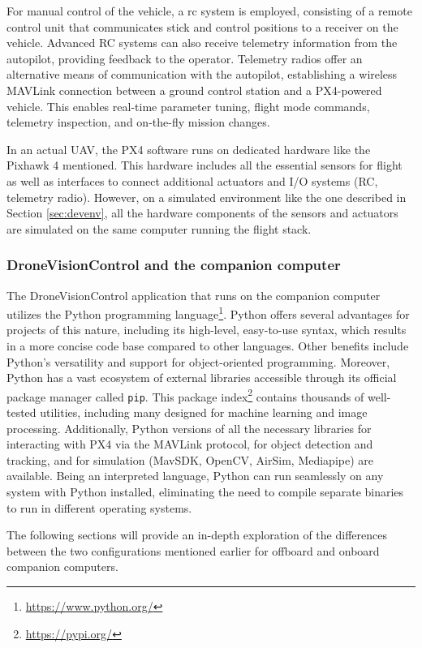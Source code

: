 For manual control of the vehicle, a \acrfull{rc} system is employed, consisting of a remote control unit that communicates stick and control positions to a receiver on the vehicle. Advanced RC systems can also receive telemetry information from the autopilot, providing feedback to the operator. Telemetry radios offer an alternative means of communication with the autopilot, establishing a wireless MAVLink connection between a ground control station and a PX4-powered vehicle. This enables real-time parameter tuning, flight mode commands, telemetry inspection, and on-the-fly mission changes.

In an actual UAV, the PX4 software runs on dedicated hardware like the Pixhawk 4 mentioned. This hardware includes all the essential sensors for flight as well as interfaces to connect additional actuators and I/O systems (RC, telemetry radio). 
However, on a simulated environment like the one described in Section \ref{sec:devenv}, all the hardware components of the sensors and actuators are simulated on the same computer running the flight stack.

\subsubsection{DroneVisionControl and the companion computer}

The DroneVisionControl application that runs on the companion computer utilizes the Python programming language\footnote{\url{https://www.python.org/}}. Python offers several advantages for projects of this nature, including its high-level, easy-to-use syntax, which results in a more concise code base compared to other languages. Other benefits include Python's versatility and support for object-oriented programming. Moreover, Python has a vast ecosystem of external libraries accessible through its official package manager called \texttt{pip}. This package index\footnote{\url{https://pypi.org/}} contains thousands of well-tested utilities, including many designed for machine learning and image processing. Additionally, Python versions of all the necessary libraries for interacting with PX4 via the MAVLink protocol, for object detection and tracking, and for simulation (MavSDK, OpenCV, AirSim, Mediapipe) are available. Being an interpreted language, Python can run seamlessly on any system with Python installed, eliminating the need to compile separate binaries to run in different operating systems.

The following sections will provide an in-depth exploration of the differences between the two configurations mentioned earlier for offboard and onboard companion computers.


